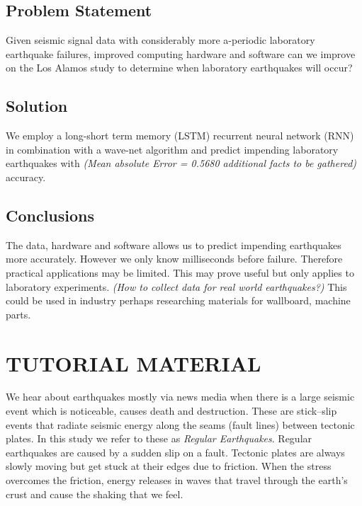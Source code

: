 \documentclass[]{llncs}
\begin{document}
\subsection{Problem Statement}
Given seismic signal data with considerably more a-periodic laboratory earthquake failures, improved computing hardware and software can we improve on the Los Alamos study\cite{Bertrand} to determine when laboratory earthquakes will occur?\par

\subsection{Solution}
We employ a long-short term memory (LSTM) recurrent neural network (RNN) in combination with a wave-net algorithm and predict impending laboratory earthquakes with {\em (Mean absolute Error = 0.5680 additional facts to be gathered)} accuracy.
\subsection{Conclusions}
The data, hardware and software allows us to predict impending earthquakes more accurately. However we only know milliseconds before failure. Therefore practical applications may be limited. This may prove useful but only applies to laboratory experiments. {\em (How to collect data for real world earthquakes?)}  This could be used in industry perhaps researching materials for wallboard, machine parts.\par


\section{TUTORIAL MATERIAL}
We hear about earthquakes mostly via news media when there is a large seismic event which is noticeable, causes death and destruction. These are stick–slip events that radiate seismic energy along the seams (fault lines) between tectonic plates. In this study we refer to these as {\em Regular Earthquakes}. Regular earthquakes are caused by a sudden slip on a fault. Tectonic plates are always slowly moving but get stuck at their edges due to friction. When the stress overcomes the friction, energy releases in waves that travel through the earth's crust and cause the shaking that we feel.\cite{USGSfaqs}\par
\end{document}
